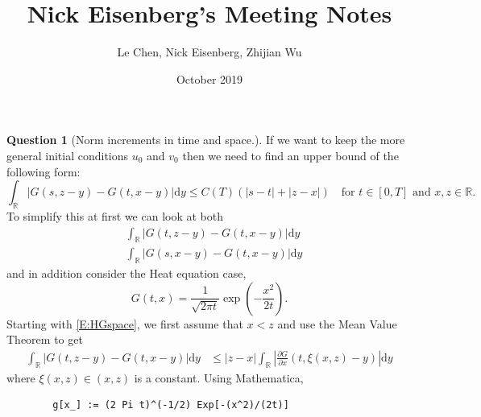 \documentclass[a4paper,11pt]{article}
\title{Nick Eisenberg's Meeting Notes}
\author{Le Chen, Nick Eisenberg, Zhijian Wu}
\date{October 2019}
\numberwithin{equation}{section}
\theoremstyle{plain}
\theoremstyle{definition}
\newtheorem{question}{Question}
\newcommand{\ud}{\ensuremath{\mathrm{d} }}
\newcommand{\R}{\mathbb{R}}
\begin{document}
\begin{question}[Norm increments in time and space.]
	If we want to keep the more general initial conditions $u_0$ and $v_0$ then we need to find an upper bound of the following form:
	\[
		\int_{\R}|G(s,z-y) - G(t,x-y)| \ud y \le C(T)(|s-t|+|z-x|) \quad \text{for } t \in [0,T] \text{ and } x,z \in \R.
	\]
	To simplify this at first we can look at both 
	\begin{align}
		\label{E:HGspace} & \int_{\R}|G(t,z-y) - G(t,x-y)| \ud y \\
		\label{E:HGtime} & \int_{\R}|G(s, x-y) - G(t,x-y)| \ud y 
	\end{align}
	and in addition consider the Heat equation case,
	\[
		G(t,x) = \frac{1}{\sqrt{2 \pi t}}\exp\left( - \frac{x^2}{2t}\right).
	\]
	Starting with \eqref{E:HGspace}, we first assume that $x < z$ and use the Mean Value Theorem to get 
	\begin{align*}
		\int_{\R}|G(t,z-y) - G(t,x-y)| \ud y & \le  |z - x| 	\int_{\R}\left|\frac{\partial G}{\partial x}(t,\xi(x,z) -y)\right|\ud y 
	\end{align*}
	where $\xi(x, z) \in (x,z)$ is a constant. Using Mathematica,
	\begin{verbatim}
		g[x_] := (2 Pi t)^(-1/2) Exp[-(x^2)/(2t)] 
		

\end{verbatim}
\end{question}
\end{document}
